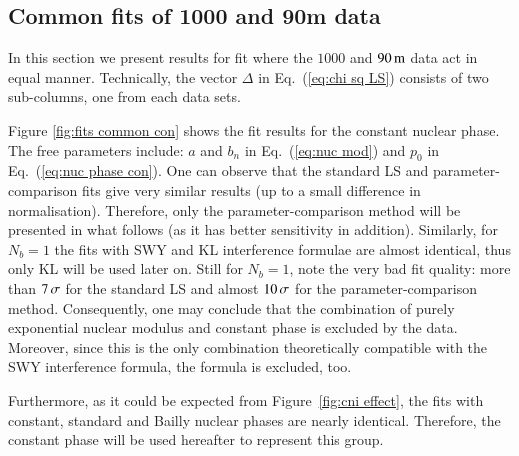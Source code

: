\subsection{Common fits of 1000 and 90m data}

In this section we present results for fit where the $1000$ and $90\,{\rm m}$ data act in equal manner. Technically, the vector $\Delta$ in Eq.~(\ref{eq:chi sq LS}) consists of two sub-columns, one from each data sets.

Figure \ref{fig:fits common con} shows the fit results for the constant nuclear phase. The free parameters include: $a$ and $b_n$ in Eq.~(\ref{eq:nuc mod}) and $p_0$ in Eq.~(\ref{eq:nuc phase con}). One can observe that the standard LS and parameter-comparison fits give very similar results (up to a small difference in normalisation). Therefore, only the parameter-comparison method will be presented in what follows (as it has better sensitivity in addition). Similarly, for $N_b = 1$ the fits with SWY and KL interference formulae are almost identical, thus only KL will be used later on. Still for $N_b = 1$, note the very bad fit quality: more than $7\,{\rm \sigma}$ for the standard LS and almost $10\,{\rm \sigma}$ for the parameter-comparison method. Consequently, one may conclude that the combination of purely exponential nuclear modulus and constant phase is excluded by the data. Moreover, since this is the only combination theoretically compatible with the SWY interference formula, the formula is excluded, too.

Furthermore, as it could be expected from Figure~\ref{fig:cni effect}, the fits with constant, standard and Bailly nuclear phases are nearly identical. Therefore, the constant phase will be used hereafter to represent this group.


